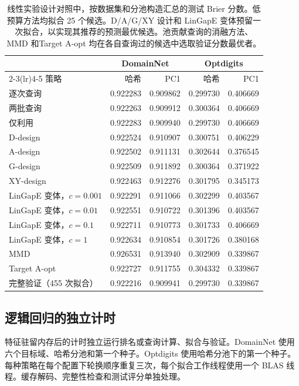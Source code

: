 \documentclass[UTF8,fontset=fandol,scheme=chinese,zihao=false,11pt,letterpaper]{ctexart}
\begin{document}
\begin{table}[!htb]
\centering
\caption{线性实验设计对照中，按数据集和分池构造汇总的测试 Brier 分数。低预算方法均拟合 25 个候选。D/A/G/XY 设计和 LinGapE 变体预留一次拟合，以实现其推荐的预测最优候选。池贡献查询的消融方法、MMD 和Target A-opt 均在各自查询过的候选中选取验证分数最优者。}
\label{tab:fresh-linear-breakdown}
\begin{tabular}{lrrrr}
\toprule
 & \multicolumn{2}{c}{DomainNet} & \multicolumn{2}{c}{Optdigits} \\
\cmidrule(lr){2-3}\cmidrule(lr){4-5}
策略 & 哈希 & PC1 & 哈希 & PC1 \\
\midrule
逐次查询 & 0.922283 & 0.909862 & 0.299730 & 0.406669 \\
两批查询 & 0.922263 & 0.909912 & 0.300364 & 0.406669 \\
仅利用 & 0.922283 & 0.909940 & 0.299730 & 0.406669 \\
D-design & 0.922524 & 0.910907 & 0.300751 & 0.406229 \\
A-design & 0.922502 & 0.911131 & 0.302644 & 0.376545 \\
G-design & 0.922509 & 0.911892 & 0.300364 & 0.371922 \\
XY-design & 0.922463 & 0.912276 & 0.301795 & 0.345173 \\
LinGapE 变体，$c=0.001$ & 0.922291 & 0.911066 & 0.302299 & 0.403567 \\
LinGapE 变体，$c=0.01$ & 0.922551 & 0.910722 & 0.301396 & 0.403567 \\
LinGapE 变体，$c=0.1$ & 0.922711 & 0.910773 & 0.301733 & 0.406669 \\
LinGapE 变体，$c=1$ & 0.922634 & 0.910854 & 0.301726 & 0.380168 \\
MMD & 0.926531 & 0.913940 & 0.302909 & 0.339867 \\
Target A-opt & 0.922727 & 0.911755 & 0.304332 & 0.339867 \\
完整验证（455 次拟合）& 0.922216 & 0.909941 & 0.299730 & 0.339867 \\
\bottomrule
\end{tabular}
\end{table}

\subsection{逻辑回归的独立计时}
\label{app:fresh-timing}
特征驻留内存后的计时独立运行排名或查询计算、拟合与验证。DomainNet 使用六个目标域、哈希分池和第一个种子。Optdigits 使用哈希分池下的第一个种子。每种策略在每个配置下轮换顺序重复三次，每个拟合工作线程使用一个 BLAS 线程。缓存解码、完整性检查和测试评分单独处理。
\end{document}
